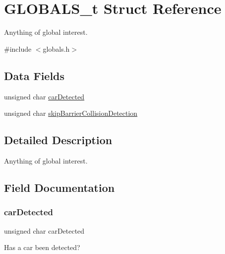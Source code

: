 \hypertarget{struct_g_l_o_b_a_l_s__t}{}\section{G\+L\+O\+B\+A\+L\+S\+\_\+t Struct Reference}
\label{struct_g_l_o_b_a_l_s__t}


Anything of global interest.  




{\ttfamily \#include $<$globals.\+h$>$}

\subsection*{Data Fields}
\begin{DoxyCompactItemize}
\item 
unsigned char \hyperlink{struct_g_l_o_b_a_l_s__t_a9c18d99b31c7cd20537939bd6dd82db6}{car\+Detected}
\item 
unsigned char \hyperlink{struct_g_l_o_b_a_l_s__t_a2bf4a581ea092e7eef6ac25ed4a8b565}{skip\+Barrier\+Collision\+Detection}
\end{DoxyCompactItemize}


\subsection{Detailed Description}
Anything of global interest. 

\subsection{Field Documentation}
\mbox{\label{struct_g_l_o_b_a_l_s__t_a9c18d99b31c7cd20537939bd6dd82db6}} 
\subsubsection{\texorpdfstring{car\+Detected}{carDetected}}
{\footnotesize\ttfamily unsigned char car\+Detected}

Has a car been detected? \mbox{\label{struct_g_l_o_b_a_l_s__t_a2bf4a581ea092e7eef6ac25ed4a8b565}} 
